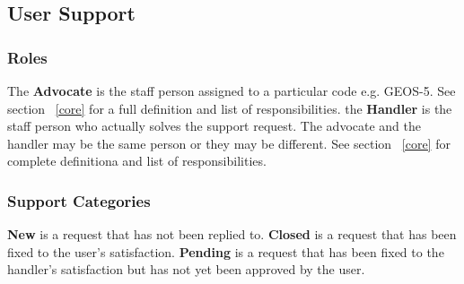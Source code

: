 \subsection{User Support}
\label{sec:usr_support}


\subsubsection{Roles}
The {\bf Advocate} is the staff person assigned to a particular code e.g. GEOS-5. See section ~\ref{core} for a full definition and list of responsibilities. 
the {\bf Handler} is the staff person who actually solves the support request. The advocate and the handler may be the same person or they may be different. See section ~\ref{core} for complete definitiona and list of responsibilities.

\subsubsection{Support Categories}
{\bf New} is a request that has not been replied to.
{\bf Closed} is a request that has been fixed to the user's satisfaction.
{\bf Pending} is a request that has been fixed to the handler's satisfaction but has not yet been approved by the user.


